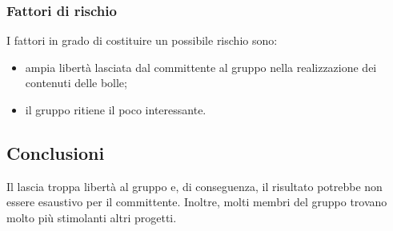 		\subsubsection {Fattori di rischio}
		I fattori in grado di costituire un possibile rischio sono:
			\begin{itemize}
				\item ampia libertà lasciata dal committente al gruppo nella realizzazione dei contenuti delle bolle;		
				\item il gruppo ritiene il  poco interessante.
			\end{itemize}
	\subsection {Conclusioni}
		Il  lascia troppa libertà al gruppo e, di conseguenza, il risultato potrebbe non essere esaustivo per il committente. Inoltre, molti membri del gruppo trovano molto più stimolanti altri progetti.
	
